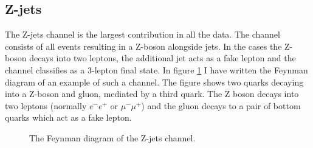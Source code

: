\subsection{Z-jets}
The Z-jets channel is the largest contribution in all the data. The channel consists of all events
resulting in a Z-boson alongside jets. In the cases the Z-boson decays into two leptons, the additional 
jet acts as a fake lepton and the channel classifies as a 3-lepton final state. In figure \ref{fig:z_pjets} 
I have written the Feynman diagram of an example of such a channel. The figure shows two quarks decaying 
into a Z-boson and gluon, mediated by a third quark. The Z boson decays into two leptons (normally 
$e^-e^+$ or $\mu^- \mu^+$) and the gluon decays to a pair of bottom quarks which act as a fake lepton. 
\begin{figure}
    \centering
    \caption{The Feynman diagram of the  Z-jets channel.}
    \label{fig:z_pjets}
\end{figure}

